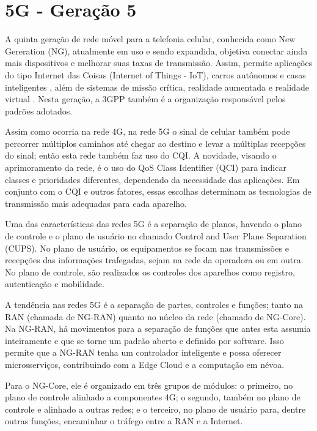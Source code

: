 \documentclass[11pt,oneside,a4paper]{abntex2}
\begin{document}
\section*{5G - Geração 5}
\label{5g}

A quinta geração de rede móvel para a telefonia celular, conhecida como New Gereration (NG), atualmente em uso e sendo expandida, objetiva conectar ainda mais dispositivos e melhorar suas taxas de transmissão. Assim, permite aplicações do tipo Internet das Coisas (Internet of Things - IoT), carros autônomos e casas inteligentes \cite{tcc2}, além de sistemas de missão crítica, realidade aumentada e realidade virtual \cite{aula6}. Nesta geração, a 3GPP também é a organização responsável pelos padrões adotados.

Assim como ocorria na rede 4G, na rede 5G o sinal de celular também pode percorrer múltiplos caminhos até chegar ao destino e levar a múltiplas recepções do sinal; então esta rede também faz uso do CQI. A novidade, visando o aprimoramento da rede, é o uso do QoS Class Identifier (QCI) para indicar classes e prioridades diferentes, dependendo da
necessidade das aplicações. Em conjunto com o CQI e outros fatores,  essas escolhas determinam as tecnologias de transmissão mais adequadas para cada aparelho.

Uma das características das redes 5G é a separação de planos, havendo o plano de controle e o plano de usuário no chamado Control and User Plane Separation (CUPS). No plano de usuário, os equipamentos se focam nas transmissões e recepções das informações trafegadas, sejam na rede da operadora ou em outra. No plano de controle, são realizados os controles dos aparelhos como registro, autenticação e mobilidade.

A tendência nas redes 5G é a separação de partes, controles e funções; tanto na RAN (chamada de NG-RAN) quanto no núcleo da rede (chamado de NG-Core). Na NG-RAN, há movimentos para a separação de funções que antes esta assumia inteiramente e que se torne um padrão aberto e definido por software. Isso permite que a NG-RAN tenha um controlador inteligente e possa oferecer microsserviços, contribuindo com a Edge Cloud e a computação em névoa.

Para o NG-Core, ele é organizado em três grupos de módulos: o primeiro, no plano de controle alinhado a componentes 4G; o segundo, também no plano de controle e alinhado a outras redes; e o terceiro, no plano de usuário para, dentre outras funções, encaminhar o tráfego entre a RAN e a Internet.
\end{document}
